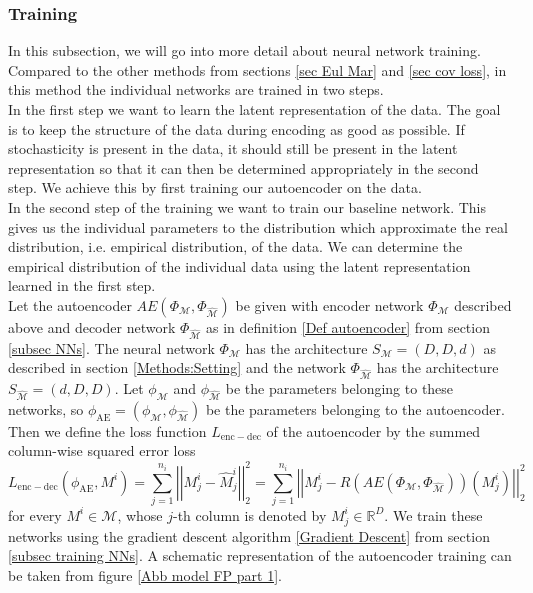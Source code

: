 \documentclass[11pt,titlepage]{article}
\newcommand{\R}{\mathbb{R}} %
\newcommand{\abs}[1]{{\left| #1 \right|}}
\theoremstyle{definition}
\theoremstyle{remark}
\begin{document}
	\subsubsection*{Training}
	
	In this subsection, we will go into more detail about neural network training. Compared to the other methods from sections \ref{sec Eul Mar} and \ref{sec cov loss}, in this method the individual networks are trained in two steps.\\
	In the first step we want to learn the latent representation of the data. The goal is to keep the structure of the data during encoding as good as possible. If stochasticity is present in the data, it should still be present in the latent representation so that it can then be determined appropriately in the second step. We achieve this by first training our autoencoder on the data.\\
	In the second step of the training we want to train our baseline network. This gives us the individual parameters to the distribution which approximate the real distribution, i.e. empirical distribution, of the data. We can determine the empirical distribution of the individual data using the latent representation learned in the first step. \\
	
	Let the autoencoder $AE(\Phi_\mathcal{M}, \Phi_{\hat{\mathcal{M}}})$ be given with encoder network $\Phi_\mathcal{M}$ described above and decoder network $\Phi_{\hat{\mathcal{M}}}$ as in definition \ref{Def autoencoder} from section \ref{subsec NNs}. The neural network $\Phi_\mathcal{M}$ has the architecture $S_\mathcal{M}=(D,D,d)$ as described in section \ref{Methods:Setting} and the network  $\Phi_{\hat{\mathcal{M}}}$ has the architecture $S_{\hat{\mathcal{M}}}=(d,D,D)$. Let $\phi_\mathcal{M}$ and $\phi_{\hat{\mathcal{M}}}$ be the parameters belonging to these networks, so $\phi_{\mathrm{AE}}= (\phi_\mathcal{M},\phi_{\hat{\mathcal{M}}})$ be the parameters belonging to the autoencoder. Then we define the loss function $L_{\mathrm{enc-dec}}$ of the autoencoder by the 
	summed column-wise squared error loss 
	\[L_{\mathrm{enc-dec}}(\phi_{\mathrm{AE}}, M^i) = \sum_{j=1}^{n_i} \abs{\abs{M^i_j- \hat{M}^i_j}}_2^2 = \sum_{j=1}^{n_i} \abs{\abs{M^i_j- R(AE(\Phi_\mathcal{M}, \Phi_{\hat{\mathcal{M}}}))(M^i_j)}}_2^2\]
	for every $M^i\in \mathcal{M}$, whose $j$-th column is denoted by $M^i_j\in\R^D$. We train these networks using the gradient descent algorithm \ref{Gradient Descent} from section \ref{subsec training NNs}. A schematic representation of the autoencoder training can be taken from figure \ref{Abb model FP part 1}.
	
\end{document}
